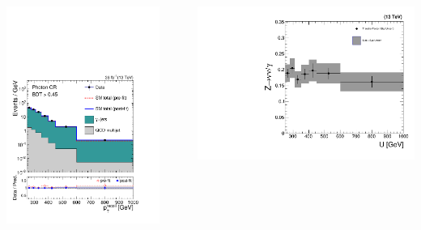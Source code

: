 \documentclass[aspectratio=169,xcolor=dvipsnames,,table,compress]{beamer}
\begin{document}
\begin{frame}
\begin{columns}
\begin{column}{0.3\textwidth}
      \includegraphics[width=\textwidth]{../figures/monotop/postfit/stackedPostfit_photon_monotop.pdf}
    \end{column}
    \begin{column}{0.05\textwidth} $=$  \end{column}
    \begin{column}{0.3\textwidth}
      \includegraphics[width=\textwidth]{../figures/monotop/xfer/rfactor_photon.pdf}

\end{column}
\end{columns}
\end{frame}
\end{document}
